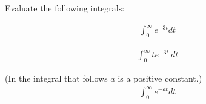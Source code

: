 

\begin{problem}
\item Evaluate the following integrals:

  \begin{subproblem}
  \item 
    \begin{eqnarray*}
      \int^\infty_0 e^{-3t} dt 
    \end{eqnarray*}
    \vfill

  \item 
    \begin{eqnarray*}
      \int^\infty_0 t e^{-3t} ~ dt
    \end{eqnarray*}
    \vfill
    
  \item (In the  integral that follows $a$ is a positive constant.)
    \begin{eqnarray*}
      \int^\infty_0 e^{-at} dt 
    \end{eqnarray*}
    \vfill

  \end{subproblem}
\end{problem}

